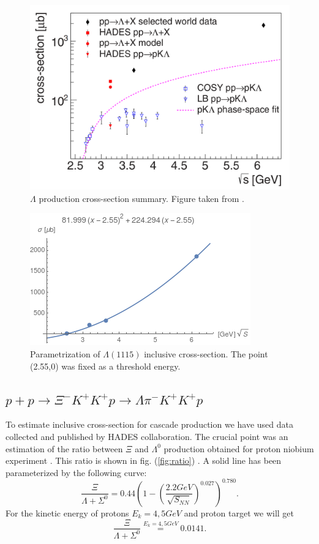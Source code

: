 \documentclass[12pt]{article}
\begin{document}
\begin{figure}[]
  \label{fig:LambdaCS}
  \centering 
  \includegraphics[width=0.8 \textwidth] {../Images/LambdaCS}
  \caption{$\Lambda$ production cross-section summary. Figure taken from \cite{Lambda3.5}.}
\end{figure}
\begin{figure}[]
  \label{fig:LambdaParam}
  \centering 
  \includegraphics[width=0.6 \textwidth] {../Images/wykres}
  \caption{Parametrization of $\Lambda(1115)$ inclusive cross-section. The point (2.55,0) was fixed as a threshold energy.}
\end{figure}

\subsection{$p+p \rightarrow \Xi^- K^+ K^+ p \rightarrow \Lambda \pi^- K^+ K^+ p$}
To estimate inclusive cross-section for cascade production we have used data collected and published by HADES collaboration. The crucial point was an estimation of the ratio between $\Xi$ and $\Lambda^0$ production obtained for proton niobium experiment \cite{Ksi3.5}. This ratio is shown in fig. (\ref{fig:ratio})
. A solid line has been parameterized  by the following curve:
\begin{equation}
  \frac{\Xi}{\Lambda + \Sigma^0}=0.44 \left( 1- \left(\frac{2.2 GeV}{\sqrt{S_{NN}}} \right)^{0.027} \right)^{0.780} . 
\end{equation}
For the kinetic energy of protons $E_k=4,5 GeV$ and proton target we will get
\begin{equation}
  \frac{\Xi}{\Lambda + \Sigma^0}\stackrel{E_k=4,5GeV}{=} 0.0141.
\end{equation}
\end{document}
